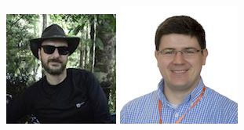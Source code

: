 \documentclass{beamer}
\begin{document}
\begin{frame}
\begin{columns}
\begin{column}{.2\textwidth}
\begin{center}
                \includegraphics[width=.8\textwidth]{img/fellows/jon-hill_thumb.jpg}
                \vspace{.2cm}
                \includegraphics[width=.8\textwidth]{img/fellows/manuel-corpas_thumb.jpg}
            \end{center}
        \end{column}


\end{columns}
\end{frame}
\end{document}

